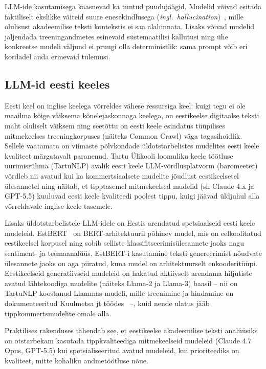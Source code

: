 LLM-ide kasutamisega kaasnevad ka tuntud puudujäägid. Mudelid võivad esitada faktiliselt ekslikke väiteid suure enesekindlusega (\emph{ingl.\ hallucination})~\cite{ji_hallucination_2023}, mille olulisust akadeemilise teksti kontekstis ei saa alahinnata. Lisaks võivad mudelid jäljendada treeningandmetes esinevaid süstemaatilisi kallutusi ning ühe konkreetse mudeli väljund ei pruugi olla deterministlik: sama prompt võib eri kordadel anda erinevaid tulemusi.

\subsection{LLM-id eesti keeles} \label{taust:eesti}

Eesti keel on inglise keelega võrreldes vähese ressursiga keel: kuigi tegu ei ole maailma kõige väiksema kõnelejaskonnaga keelega, on eestikeelse digitaalse teksti maht oluliselt väiksem ning seetõttu on eesti keele esindatus tüüpilises mitmekeelses treeningkorpuses (näiteks Common Crawl) väga tagasihoidlik. Sellele vaatamata on viimaste põlvkondade üldotstarbelistes mudelites eesti keele kvaliteet märgatavalt paranenud. Tartu Ülikooli loomuliku keele töötluse uurimisrühma (TartuNLP) avalik eesti keele LLM-võrdlusplatvorm (baromeeter)~\cite{tartunlp_baromeeter_2025} võrdleb nii avatud kui ka kommertsiaalsete mudelite jõudlust eestikeelsetel ülesannetel ning näitab, et tipptasemel mitmekeelsed mudelid (sh Claude 4.x ja GPT-5.5) kuuluvad eesti keele kvaliteedi poolest tippu, kuigi jäävad üldjuhul alla võrreldavale inglise keele tasemele.

Lisaks üldotstarbelistele LLM-idele on Eestis arendatud spetsiaalseid eesti keele mudeleid. EstBERT~\cite{tanvir_estbert_2021} on BERT-arhitektuuril põhinev mudel, mis on eelkoolitatud eestikeelsel korpusel ning sobib selliste klassifitseerimisülesannete jaoks nagu sentiment- ja teemaanalüüs. EstBERT-i kasutamine teksti genereerimist nõudvate ülesannete jaoks on aga piiratud, kuna mudel on arhitektuurselt enkooderitüüpi. Eestikeelseid generatiivseid mudeleid on hakatud aktiivselt arendama hiljutiste avatud lähtekoodiga mudelite (näiteks Llama-2 ja Llama-3) baasil -- nii on TartuNLP koostanud Llammas-mudeli, mille treenimine ja hindamine on dokumenteeritud Kuulmetsa jt töödes~\cite{kuulmets_llammas_2024, kuulmets_finnougri_2025} --, kuid nende ulatus jääb tippkommertsmudelite omale alla.

Praktilises rakenduses tähendab see, et eestikeelse akadeemilise teksti analüüsiks on otstarbekam kasutada tippkvaliteediga mitmekeelseid mudeleid (Claude 4.7 Opus, GPT-5.5) kui spetsialiseeritud avatud mudeleid, kui prioriteediks on kvaliteet, mitte kohaliku andmetöötluse nõue.

